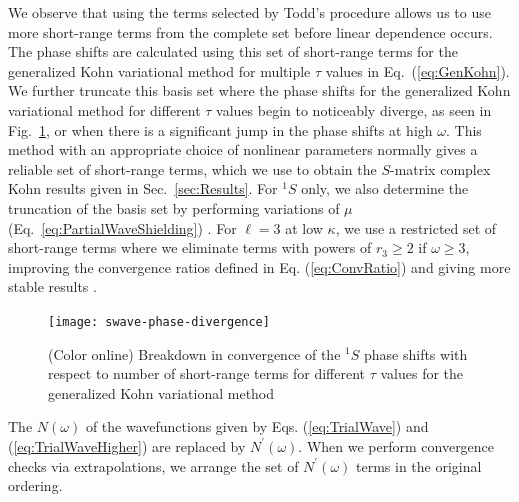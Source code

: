 \documentclass[preprint,showpacs,showkeys,preprintnumbers,amsmath,amssymb,longbibliography,pra,aps]{revtex4-1}
\begin{document}
{We observe that using the terms selected by Todd's procedure allows us to
use more short-range terms from the complete set before linear dependence occurs.
The phase shifts are calculated using this set of short-range terms for the 
generalized Kohn variational method for multiple $\tau$ values in
Eq.~(\ref{eq:GenKohn}). We further truncate this basis set where the phase
shifts for the generalized Kohn variational method
for different $\tau$ values begin to noticeably diverge, as seen in
Fig.~\ref{fig:swave-phase-divergence}, or when there is a significant jump in
the phase shifts at high $\omega$. This method with an appropriate choice of
nonlinear parameters normally gives a reliable set of
short-range terms, which we use to obtain the $S$-matrix complex Kohn
results given in Sec.~\ref{sec:Results}. For $^1S$ only, we also determine
the truncation of the basis set by performing variations of $\mu$
(Eq.~\ref{eq:PartialWaveShielding}) \cite{WoodsDiss2015}.
For $\ell = 3$ at low $\kappa$, we use a restricted set of short-range terms
where we eliminate terms with powers of $r_3 \geq 2$ if $\omega \geq 3$,
improving the convergence ratios defined in Eq. (\ref{eq:ConvRatio})
and giving more stable results
\cite{VanReeth2003,WoodsDiss2015}.
\begin{figure}[H]
	\centering
	\texttt{[image: swave-phase-divergence]}
	\caption{(Color online) Breakdown in convergence of the $^1S$ phase
shifts with respect to number of short-range terms for different $\tau$
values for the generalized Kohn variational method}
	\label{fig:swave-phase-divergence}
\end{figure}

The $N(\omega)$ of the wavefunctions given by Eqs. (\ref{eq:TrialWave}) and
(\ref{eq:TrialWaveHigher}) are replaced by $N^\prime(\omega)$.
When we perform convergence checks via extrapolations, we
arrange the set of $N^\prime(\omega)$ terms in the original ordering.

}
\end{document}
